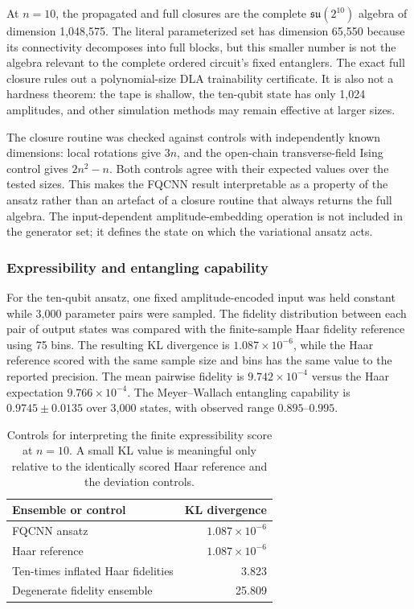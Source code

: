 \documentclass[conference]{IEEEtran}
\begin{document}
At $n=10$, the propagated and full closures are the complete
$\mathfrak{su}(2^{10})$ algebra of dimension 1,048,575. The literal
parameterized set has dimension 65,550 because its connectivity decomposes into
full blocks, but this smaller number is not the algebra relevant to the complete
ordered circuit's fixed entanglers. The exact full closure rules out a
polynomial-size DLA trainability certificate. It is also not a
hardness theorem: the tape is shallow, the ten-qubit state has only 1,024
amplitudes, and other simulation methods may remain effective at larger sizes.

The closure routine was checked against controls with independently known
dimensions: local rotations give $3n$, and the open-chain transverse-field
Ising control gives $2n^2-n$. Both controls agree with their expected values
over the tested sizes. This makes the FQCNN result interpretable as a property
of the ansatz rather than an artefact of a closure routine that always returns
the full algebra. The input-dependent amplitude-embedding operation is not
included in the generator set; it defines the state on which the variational
ansatz acts.

\subsubsection{Expressibility and entangling capability}
For the ten-qubit ansatz, one fixed amplitude-encoded input was held
constant while 3,000 parameter pairs were sampled. The fidelity distribution
between each pair of output states was compared with the finite-sample Haar
fidelity reference using 75 bins.  The resulting KL divergence is
$1.087\times10^{-6}$, while the Haar reference scored with the same sample size
and bins has the same value to the reported precision. The mean pairwise
fidelity is $9.742\times10^{-4}$ versus the Haar expectation
$9.766\times10^{-4}$. The Meyer--Wallach entangling capability is
$0.9745\pm0.0135$ over 3,000 states, with observed range $0.895$--$0.995$.

\begin{table}[!t]
\caption{Controls for interpreting the finite expressibility score at $n=10$. A small KL value is meaningful only relative to the identically scored Haar reference and the deviation controls.}
\label{tab:expressibility}
\centering
\small
\begin{tabular}{@{}lr@{}}
\toprule
\textbf{Ensemble or control} & \textbf{KL divergence} \\
\midrule
FQCNN ansatz & $1.087\times10^{-6}$ \\
Haar reference & $1.087\times10^{-6}$ \\
Ten-times inflated Haar fidelities & 3.823 \\
Degenerate fidelity ensemble & 25.809 \\
\bottomrule
\end{tabular}
\end{table}
\end{document}
